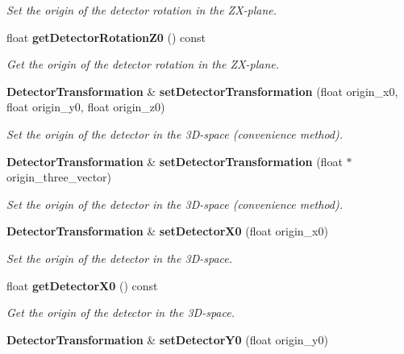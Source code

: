 \begin{DoxyCompactItemize}
\begin{DoxyCompactList}\small\item\em Set the origin of the detector rotation in the Z\-X-\/plane. \end{DoxyCompactList}\item 
float {\bf get\-Detector\-Rotation\-Z0} () const \label{classCALICE_1_1DetectorTransformation_afd32ba2a1636520f713cee65d6f5b5dc}

\begin{DoxyCompactList}\small\item\em Get the origin of the detector rotation in the Z\-X-\/plane. \end{DoxyCompactList}\item 
{\bf Detector\-Transformation} \& {\bf set\-Detector\-Transformation} (float origin\-\_\-x0, float origin\-\_\-y0, float origin\-\_\-z0)\label{classCALICE_1_1DetectorTransformation_aff20896660ff50a94ffe067ccdc56ac6}

\begin{DoxyCompactList}\small\item\em Set the origin of the detector in the 3\-D-\/space (convenience method). \end{DoxyCompactList}\item 
{\bf Detector\-Transformation} \& {\bf set\-Detector\-Transformation} (float $\ast$origin\-\_\-three\-\_\-vector)\label{classCALICE_1_1DetectorTransformation_ae390bbf318d5747c72d77b6cd364540b}

\begin{DoxyCompactList}\small\item\em Set the origin of the detector in the 3\-D-\/space (convenience method). \end{DoxyCompactList}\item 
{\bf Detector\-Transformation} \& {\bf set\-Detector\-X0} (float origin\-\_\-x0)\label{classCALICE_1_1DetectorTransformation_a12be9cd46f36fbd4995afb93b0001630}

\begin{DoxyCompactList}\small\item\em Set the origin of the detector in the 3\-D-\/space. \end{DoxyCompactList}\item 
float {\bf get\-Detector\-X0} () const \label{classCALICE_1_1DetectorTransformation_ad3b792347abe29df128864f8d93db90b}

\begin{DoxyCompactList}\small\item\em Get the origin of the detector in the 3\-D-\/space. \end{DoxyCompactList}\item 
{\bf Detector\-Transformation} \& {\bf set\-Detector\-Y0} (float origin\-\_\-y0)\label{classCALICE_1_1DetectorTransformation_a8aa19f83e78ce547f6144b0ca055f5b4}


\end{DoxyCompactItemize}
